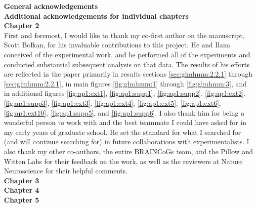 {\large \textbf{General acknowledgements}} \\
{\large \textbf{Additional acknowledgements for individual chapters}}\\
\textbf{Chapter 2} \\
First and foremost, I would like to thank my co-first author on the manuscript, Scott Bolkan, for his invaluable contributions to this project. He and Ilana conceived of the experimental work, and he performed all of the experiments and conducted substantial subsequent analysis on that data. The results of his efforts are reflected in the paper primarily in results sections \ref{sec:glmhmm:2.2.1} through \ref{sec:glmhmm:2.2.1}, in main figures \ref{fig:glmhmm:1} through \ref{fig:glmhmm:3}, and in additional figures \ref{fig:ap1:ext1}, \ref{fig:ap1:supp1}, \ref{fig:ap1:supp2}, \ref{fig:ap1:ext2}, \ref{fig:ap1:supp3}, \ref{fig:ap1:ext3}, \ref{fig:ap1:ext4}, \ref{fig:ap1:ext5}, \ref{fig:ap1:ext6}, \ref{fig:ap1:ext10}, \ref{fig:ap1:supp5}, and \ref{fig:ap1:supp6}. I also thank him for being a wonderful person to work with and the best teammate I could have asked for in my early years of graduate school. He set the standard for what I searched for (and will continue searching for) in future collaborations with experimentalists. I also thank my other co-authors, the entire BRAINCoGs team, and the Pillow and Witten Labs for their feedback on the work, as well as the reviewers at Nature Neuroscience for their helpful comments. \\
\textbf{Chapter 3} \\
\textbf{Chapter 4} \\
\textbf{Chapter 5} \\
